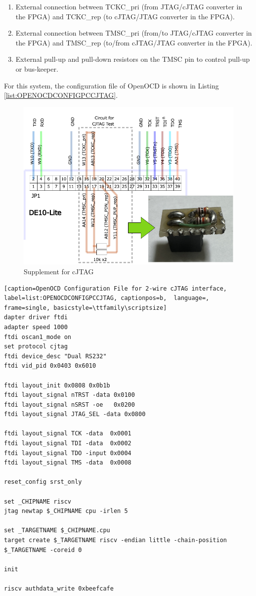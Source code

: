 \begin{enumerate}
  \item External connection between TCKC\_pri (from JTAG/cJTAG converter in the FPGA) and TCKC\_rep (to cJTAG/JTAG converter in the FPGA).
  \item External connection between TMSC\_pri (from/to JTAG/cJTAG converter in the FPGA) and TMSC\_rep (to/from cJTAG/JTAG converter in the FPGA).
  \item External pull-up and pull-down resistors on the TMSC pin to control pull-up or bus-keeper.
\end{enumerate}

For this system, the configuration file of OpenOCD is shown in Listing \ref{list:OPENOCDCONFIGPCCJTAG}.

\begin{figure}[H]
    \includegraphics[width=1.0\columnwidth]{./Figure/USB_cJTAG_Supplement.png}
    \caption{Supplement for cJTAG}
    \label{fig:USBCJTAGSUPPLEMENT}
\end{figure}


\begin{lstlisting}[caption=OpenOCD Configuration File for 2-wire cJTAG interface, label=list:OPENOCDCONFIGPCCJTAG, captionpos=b,  language=, frame=single, basicstyle=\ttfamily\scriptsize]
dapter driver ftdi
adapter speed 1000
ftdi oscan1_mode on
set protocol cjtag
ftdi device_desc "Dual RS232"
ftdi vid_pid 0x0403 0x6010

ftdi layout_init 0x0808 0x0b1b
ftdi layout_signal nTRST -data 0x0100
ftdi layout_signal nSRST -oe   0x0200
ftdi layout_signal JTAG_SEL -data 0x0800

ftdi layout_signal TCK -data  0x0001
ftdi layout_signal TDI -data  0x0002
ftdi layout_signal TDO -input 0x0004
ftdi layout_signal TMS -data  0x0008

reset_config srst_only

set _CHIPNAME riscv
jtag newtap $_CHIPNAME cpu -irlen 5

set _TARGETNAME $_CHIPNAME.cpu
target create $_TARGETNAME riscv -endian little -chain-position $_TARGETNAME -coreid 0

init

riscv authdata_write 0xbeefcafe
\end{lstlisting}


